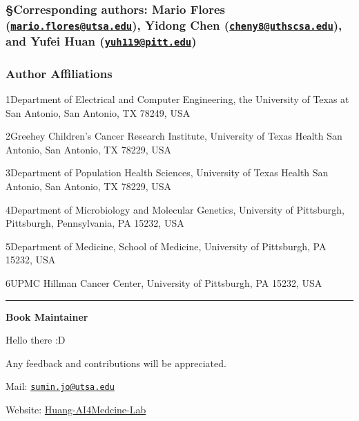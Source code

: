 \documentclass[
]{book}
\begin{document}
\hypertarget{corresponding-authors-mario-flores-mario.floresutsa.edu-yidong-chen-cheny8uthscsa.edu-and-yufei-huan-yuh119pitt.edu}{%
\subsubsection*{\texorpdfstring{\textbf{§Corresponding authors}: Mario Flores (\href{mailto:mario.flores@utsa.edu}{\nolinkurl{mario.flores@utsa.edu}}), Yidong Chen (\href{mailto:cheny8@uthscsa.edu}{\nolinkurl{cheny8@uthscsa.edu}}), and Yufei Huan (\href{mailto:yuh119@pitt.edu}{\nolinkurl{yuh119@pitt.edu}})}{§Corresponding authors: Mario Flores (mario.flores@utsa.edu), Yidong Chen (cheny8@uthscsa.edu), and Yufei Huan (yuh119@pitt.edu)}}\label{corresponding-authors-mario-flores-mario.floresutsa.edu-yidong-chen-cheny8uthscsa.edu-and-yufei-huan-yuh119pitt.edu}}

\hypertarget{author-affiliations}{%
\subsubsection*{\texorpdfstring{\textbf{Author Affiliations}}{Author Affiliations}}\label{author-affiliations}}

1Department of Electrical and Computer Engineering, the University of Texas at San Antonio, San Antonio, TX 78249, USA

2Greehey Children's Cancer Research Institute, University of Texas Health San Antonio, San Antonio, TX 78229, USA

3Department of Population Health Sciences, University of Texas Health San Antonio, San Antonio, TX 78229, USA

4Department of Microbiology and Molecular Genetics, University of Pittsburgh, Pittsburgh, Pennsylvania, PA 15232, USA

5Department of Medicine, School of Medicine, University of Pittsburgh, PA 15232, USA

6UPMC Hillman Cancer Center, University of Pittsburgh, PA 15232, USA

\begin{center}\rule{0.5\linewidth}{0.5pt}\end{center}

\textbf{Book Maintainer}

Hello there :D

Any feedback and contributions will be appreciated.

Mail: \href{mailto:sumin.jo@utsa.edu}{\nolinkurl{sumin.jo@utsa.edu}}

Website: \href{https://github.com/Huang-AI4Medicine-Lab}{Huang-AI4Medcine-Lab}

  
\end{document}
